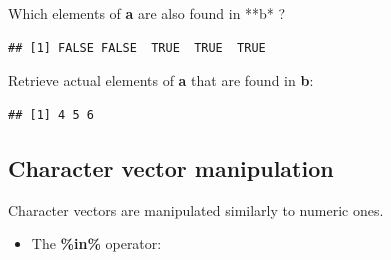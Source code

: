 \documentclass[]{book}
\newenvironment{Shaded}{\begin{snugshade}}{\end{snugshade}}
\newcommand{\DecValTok}[1]{\textcolor[rgb]{0.00,0.00,0.81}{#1}}
\newcommand{\KeywordTok}[1]{\textcolor[rgb]{0.13,0.29,0.53}{\textbf{#1}}}
\newcommand{\NormalTok}[1]{#1}
\newcommand{\OperatorTok}[1]{\textcolor[rgb]{0.81,0.36,0.00}{\textbf{#1}}}
\newcommand{\StringTok}[1]{\textcolor[rgb]{0.31,0.60,0.02}{#1}}
\providecommand{\tightlist}{%
  \setlength{\itemsep}{0pt}\setlength{\parskip}{0pt}}
\begin{document}
Which elements of \textbf{a} are also found in **b* ?

\begin{Shaded}
\end{Shaded}

\begin{verbatim}
## [1] FALSE FALSE  TRUE  TRUE  TRUE
\end{verbatim}

Retrieve actual elements of \textbf{a} that are found in \textbf{b}:

\begin{Shaded}
\end{Shaded}

\begin{verbatim}
## [1] 4 5 6
\end{verbatim}

\hypertarget{character-vector-manipulation}{%
\subsection{Character vector manipulation}\label{character-vector-manipulation}}

Character vectors are manipulated similarly to numeric ones.

\begin{itemize}
\tightlist
\item
  The \textbf{\%in\%} operator:
\end{itemize}

\begin{Shaded}
\end{Shaded}
\end{document}
